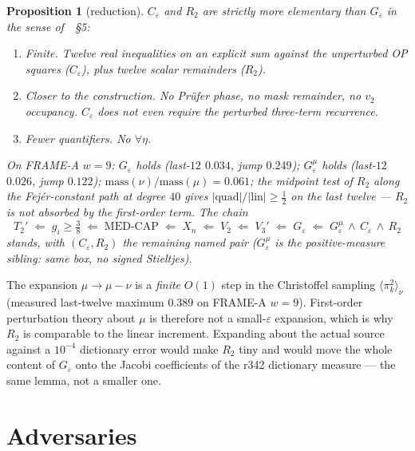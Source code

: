 \documentclass[11pt]{article}
\newtheorem{prop}{Proposition}
\theoremstyle{remark}
\begin{document}
\begin{prop}[reduction]\label{prop:red}
$C_\varepsilon$ and $R_2$ are strictly more elementary than
$G_\varepsilon$ in the sense of~\cite{v2}~\S5:
\begin{enumerate}
\item \emph{Finite.}  Twelve real inequalities on an explicit
  sum against the \emph{unperturbed} OP squares ($C_\varepsilon$),
  plus twelve scalar remainders ($R_2$).
\item \emph{Closer to the construction.}  No Pr\"ufer phase, no
  mask remainder, no $v_2$ occupancy.  $C_\varepsilon$ does not
  even require the perturbed three-term recurrence.
\item \emph{Fewer quantifiers.}  No $\forall\eta$.
\end{enumerate}
On FRAME-A $w=9$: $G_\varepsilon$ holds (last-$12$ $0.034$, jump
$0.249$); $G_\varepsilon^\mu$ holds (last-$12$ $0.026$, jump
$0.122$); $\mathrm{mass}(\nu)/\mathrm{mass}(\mu)=0.061$;
the midpoint test of $R_2$ along the Fej\'er-constant path at
degree $40$ gives $\lvert\mathrm{quad}\rvert/\lvert\mathrm{lin}\rvert\ge\tfrac12$
on the last twelve --- $R_2$ is \emph{not} absorbed by the first-order
term.  The chain
\[
T_2'
 \;\Longleftarrow\;
 g_i\ge\tfrac38
 \;\Longleftarrow\;
 \mathrm{MED\text{-}CAP}
 \;\Longleftarrow\;
 X_n
 \;\Longleftarrow\;
 V_2
 \;\Longleftarrow\;
 V_3'
 \;\Longleftarrow\;
 G_\varepsilon
 \;\Longleftarrow\;
 G_\varepsilon^\mu\,\wedge\,C_\varepsilon\,\wedge\,R_2
\]
stands, with $(C_\varepsilon,R_2)$ the remaining named pair
($G_\varepsilon^\mu$ is the positive-measure sibling: same box,
no signed Stieltjes).
\end{prop}

The expansion $\mu\to\mu-\nu$ is a \emph{finite} $O(1)$ step in the
Christoffel sampling $\langle\pi_k^2\rangle_\nu$ (measured last-twelve
maximum $0.389$ on FRAME-A $w=9$).  First-order perturbation theory
about $\mu$ is therefore not a small-$\varepsilon$ expansion, which
is why $R_2$ is comparable to the linear increment.  Expanding about
the actual source against a $10^{-4}$ dictionary error would make
$R_2$ tiny and would move the whole content of $G_\varepsilon$ onto
the Jacobi coefficients of the r342 dictionary measure --- the same
lemma, not a smaller one.

\section{Adversaries}\label{sec:adv}
\end{document}
